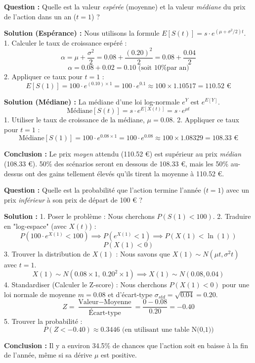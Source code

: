 \begin{examplebox}
\textbf{Question :} Quelle est la valeur \textit{espérée} (moyenne) et la valeur \textit{médiane} du prix de l'action dans un an ($t=1$) ?

\textbf{Solution (Espérance) :}
Nous utilisons la formule $E[S(t)] = s \cdot e^{(\mu + \sigma^2 / 2)t}$.
1.  Calculer le taux de croissance espéré :
    $$\alpha = \mu + \frac{\sigma^2}{2} = 0.08 + \frac{(0.20)^2}{2} = 0.08 + \frac{0.04}{2}$$
    $$\alpha = 0.08 + 0.02 = 0.10 \text{ (soit 10\% par an)}$$
2.  Appliquer ce taux pour $t=1$ :
    $$E[S(1)] = 100 \cdot e^{(0.10) \times 1} = 100 \cdot e^{0.1} \approx 100 \times 1.10517 = 110.52 \text{ €}$$
    
\textbf{Solution (Médiane) :}
La médiane d'une loi log-normale $e^Y$ est $e^{E[Y]}$.
$$\text{Médiane}[S(t)] = s \cdot e^{E[X(t)]} = s \cdot e^{\mu t}$$
1.  Utiliser le taux de croissance de la médiane, $\mu = 0.08$.
2.  Appliquer ce taux pour $t=1$ :
    $$\text{Médiane}[S(1)] = 100 \cdot e^{0.08 \times 1} = 100 \cdot e^{0.08} \approx 100 \times 1.08329 = 108.33 \text{ €}$$

\textbf{Conclusion :} Le prix \textit{moyen} attendu (110.52 €) est supérieur au prix \textit{médian} (108.33 €). 50\% des scénarios seront en dessous de 108.33 €, mais les 50\% au-dessus ont des gains tellement élevés qu'ils tirent la moyenne à 110.52 €.
\end{examplebox}

\begin{examplebox}
\textbf{Question :} Quelle est la probabilité que l'action termine l'année ($t=1$) avec un prix \textit{inférieur} à son prix de départ de 100 € ?

\textbf{Solution :}
1.  Poser le problème : Nous cherchons $P(S(1) < 100)$.
2.  Traduire en "log-espace" (avec $X(t)$) :
    $$P(100 \cdot e^{X(1)} < 100) \implies P(e^{X(1)} < 1) \implies P(X(1) < \ln(1))$$
    $$P(X(1) < 0)$$
3.  Trouver la distribution de $X(1)$ :
    Nous savons que $X(1) \sim N(\mu t, \sigma^2 t)$ avec $t=1$.
    $$X(1) \sim N(0.08 \times 1, \ 0.20^2 \times 1) \implies X(1) \sim N(0.08, 0.04)$$
4.  Standardiser (Calculer le Z-score) :
    Nous cherchons $P(X(1) < 0)$ pour une loi normale de moyenne $m=0.08$ et d'écart-type $\sigma_{std}=\sqrt{0.04}=0.20$.
    $$Z = \frac{\text{Valeur} - \text{Moyenne}}{\text{Écart-type}} = \frac{0 - 0.08}{0.20} = -0.40$$
5.  Trouver la probabilité :
    $$P(Z < -0.40) \approx 0.3446 \text{ (en utilisant une table N(0,1))}$$

\textbf{Conclusion :} Il y a environ 34.5\% de chances que l'action soit en baisse à la fin de l'année, même si sa dérive $\mu$ est positive.
\end{examplebox}

